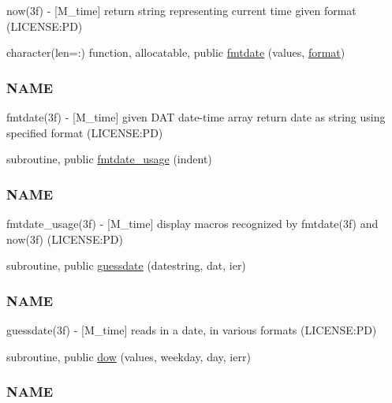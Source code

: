 \begin{DoxyCompactItemize}
\begin{DoxyCompactList}
now(3f) -\/ \mbox{[}M\+\_\+time\mbox{]} return string representing current time given format (L\+I\+C\+E\+N\+SE\+:PD) \end{DoxyCompactList}\item 
character(len=\+:) function, allocatable, public \mbox{\hyperlink{namespacem__time_a2cb84c9b8af4f395b76aed76e1431328}{fmtdate}} (values, \mbox{\hyperlink{namespacem__time_a8d843c997d304f40fd5aed820c5a7473}{format}})
\begin{DoxyCompactList}\small\item\em \subsubsection*{N\+A\+ME}

fmtdate(3f) -\/ \mbox{[}M\+\_\+time\mbox{]} given D\+AT date-\/time array return date as string using specified format (L\+I\+C\+E\+N\+SE\+:PD) \end{DoxyCompactList}\item 
subroutine, public \mbox{\hyperlink{namespacem__time_a914927f70fb9495af1be2e484b967111}{fmtdate\+\_\+usage}} (indent)
\begin{DoxyCompactList}\small\item\em \subsubsection*{N\+A\+ME}

fmtdate\+\_\+usage(3f) -\/ \mbox{[}M\+\_\+time\mbox{]} display macros recognized by fmtdate(3f) and now(3f) (L\+I\+C\+E\+N\+SE\+:PD) \end{DoxyCompactList}\item 
subroutine, public \mbox{\hyperlink{namespacem__time_aa5198c7aa4f3d8411c8ce93046ce3794}{guessdate}} (datestring, dat, ier)
\begin{DoxyCompactList}\small\item\em \subsubsection*{N\+A\+ME}

guessdate(3f) -\/ \mbox{[}M\+\_\+time\mbox{]} reads in a date, in various formats (L\+I\+C\+E\+N\+SE\+:PD) \end{DoxyCompactList}\item 
subroutine, public \mbox{\hyperlink{namespacem__time_adfda8a89820b8d0ad4581a14896e4ce5}{dow}} (values, weekday, day, ierr)
\begin{DoxyCompactList}\small\item\em \subsubsection*{N\+A\+ME}


\end{DoxyCompactList}
\end{DoxyCompactItemize}
